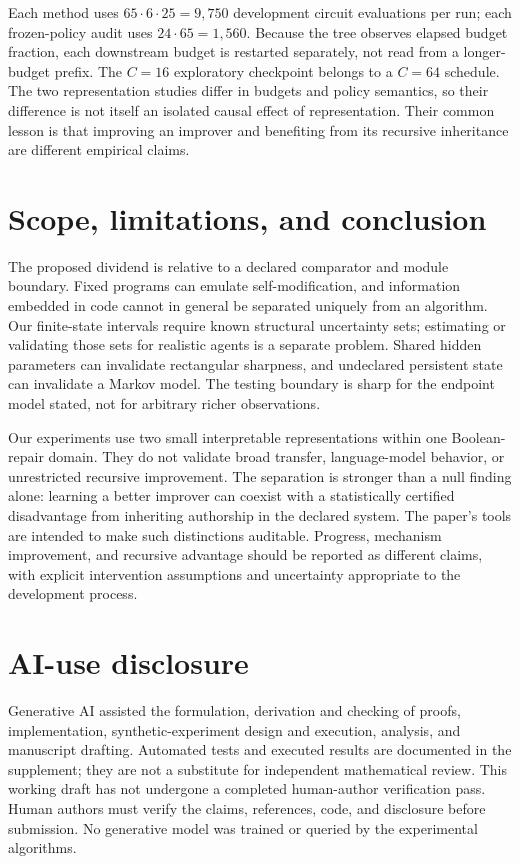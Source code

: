 \documentclass{article}
\theoremstyle{definition}
\begin{document}
Each method uses $65\cdot6\cdot25=9,750$ development circuit evaluations per run; each frozen-policy audit uses $24\cdot65=1,560$. Because the tree observes elapsed budget fraction, each downstream budget is restarted separately, not read from a longer-budget prefix. The $C=16$ exploratory checkpoint belongs to a $C=64$ schedule. The two representation studies differ in budgets and policy semantics, so their difference is not itself an isolated causal effect of representation. Their common lesson is that improving an improver and benefiting from its recursive inheritance are different empirical claims.

\section{Scope, limitations, and conclusion}\label{sec:limitations}
The proposed dividend is relative to a declared comparator and module boundary. Fixed programs can emulate self-modification, and information embedded in code cannot in general be separated uniquely from an algorithm. Our finite-state intervals require known structural uncertainty sets; estimating or validating those sets for realistic agents is a separate problem. Shared hidden parameters can invalidate rectangular sharpness, and undeclared persistent state can invalidate a Markov model. The testing boundary is sharp for the endpoint model stated, not for arbitrary richer observations.

Our experiments use two small interpretable representations within one Boolean-repair domain. They do not validate broad transfer, language-model behavior, or unrestricted recursive improvement. The separation is stronger than a null finding alone: learning a better improver can coexist with a statistically certified disadvantage from inheriting authorship in the declared system. The paper's tools are intended to make such distinctions auditable. Progress, mechanism improvement, and recursive advantage should be reported as different claims, with explicit intervention assumptions and uncertainty appropriate to the development process.

\clearpage
\section*{AI-use disclosure}
Generative AI assisted the formulation, derivation and checking of proofs, implementation, synthetic-experiment design and execution, analysis, and manuscript drafting. Automated tests and executed results are documented in the supplement; they are not a substitute for independent mathematical review. This working draft has not undergone a completed human-author verification pass. Human authors must verify the claims, references, code, and disclosure before submission. No generative model was trained or queried by the experimental algorithms.
\end{document}
